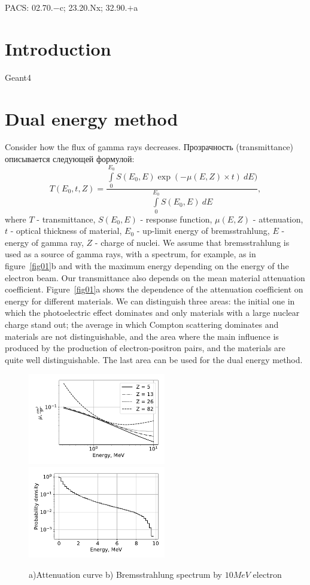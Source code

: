 \documentclass[a4paper]{panl}
\begin{document}
\noindent
PACS: 02.70.$-$c; 23.20.Nx; 32.90.$+$a

\newpage
\label{sec:intro}
\section*{Introduction}
Geant4~\cite{ALLISON2016186, spirin}
\section*{Dual energy method}
Consider how the flux of gamma rays decreases. Прозрачность (transmittance) описывается следующей формулой:
\begin{equation}
\label{eq:trans}
T(E_0, t, Z) = \frac{\int \limits_0^{E_0} S(E_0, E) \exp(-\mu(E,Z)\times t)~dE)}{\int \limits_0^{E_0} S(E_0, E)~dE},
\end{equation}
where $T$ -  transmittance, $S(E_0, E)$ - response function, $\mu(E,Z)$ - attenuation, $t$ -  optical thickness of material, $E_0$ -  up-limit energy of bremsstrahlung, $E$ - energy of gamma ray, $Z$ - charge of nuclei.
We assume that bremsstrahlung is used as a source of gamma rays, with a spectrum, for example, as in figure~\ref{fig01}b and with the maximum energy depending on the energy of the electron beam. Our transmittance also depends on the mean material attenuation coefficient. Figure~\ref{fig01}a shows the dependence of the attenuation coefficient on energy for different materials. We can distinguish three areas: the initial one in which the photoelectric effect dominates and only materials with a large nuclear charge stand out; the average in which Compton scattering dominates and materials are not distinguishable, and the area where the main influence is produced by the production of electron-positron pairs, and the materials are quite well distinguishable. The last area can be used for the dual energy method.
\begin{figure}[t]
\begin{center}
\includegraphics[width=60mm]{figures/Attenuation.pdf} 
\includegraphics[width=60mm]{figures/Bremsstrahlung.pdf}  
\vspace{-3mm}
\caption{a)Attenuation curve b) Bremsstrahlung spectrum by $10 MeV$ electron}
\end{center}
\vspace{-5mm}
\end{figure}
\end{document}
